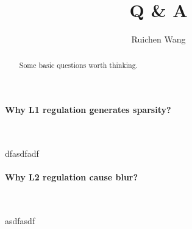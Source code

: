 \documentclass{article}
\author{Ruichen Wang}
\title{Q \& A}
\begin{document}
\maketitle
\begin{abstract}
Some basic questions worth thinking.
\end{abstract}
\noindent
\paragraph{Why L1 regulation generates sparsity?}~{}

dfasdfadf
\paragraph{Why L2 regulation cause blur?}~{}

asdfasdf
\end{document}
